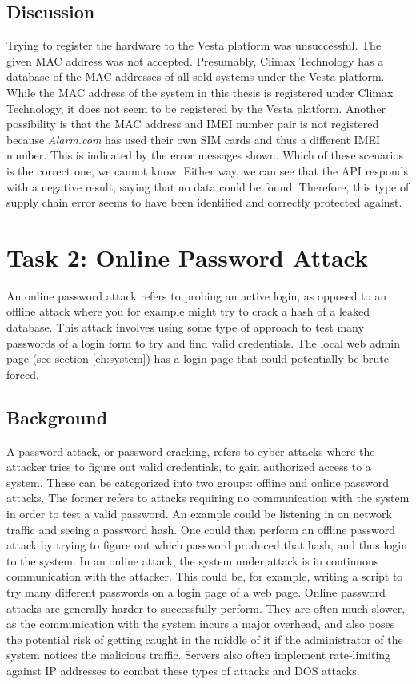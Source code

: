 \subsection{Discussion}
Trying to register the hardware to the Vesta platform was unsuccessful. The given MAC address was not accepted. Presumably, Climax Technology has a database of the MAC addresses of all sold systems under the Vesta platform. While the MAC address of the system in this thesis is registered under Climax Technology, it does not seem to be registered by the Vesta platform. Another possibility is that the MAC address and IMEI number pair is not registered because \textit{Alarm.com} has used their own SIM cards and thus a different IMEI number. This is indicated by the error messages shown. Which of these scenarios is the correct one, we cannot know. Either way, we can see that the API responds with a negative result, saying that no data could be found. Therefore, this type of supply chain error seems to have been identified and correctly protected against.

\section{Task 2: Online Password Attack} \label{ch:pentesting:password}
An online password attack refers to probing an active login, as opposed to an offline attack where you for example might try to crack a hash of a leaked database. This attack involves using some type of approach to test many passwords of a login form to try and find valid credentials. The local web admin page (see section \ref{ch:system}) has a login page that could potentially be brute-forced.

\subsection{Background}
A password attack, or password cracking, refers to cyber-attacks where the attacker tries to figure out valid credentials, to gain authorized access to a system. These can be categorized into two groups: offline and online password attacks. The former refers to attacks requiring no communication with the system in order to test a valid password. An example could be listening in on network traffic and seeing a password hash. One could then perform an offline password attack by trying to figure out which password produced that hash, and thus login to the system. In an online attack, the system under attack is in continuous communication with the attacker. This could be, for example, writing a script to try many different passwords on a login page of a web page. Online password attacks are generally harder to successfully perform. They are often much slower, as the communication with the system incurs a major overhead, and also poses the potential risk of getting caught in the middle of it if the administrator of the system notices the malicious traffic. Servers also often implement rate-limiting against IP addresses to combat these types of attacks and DOS attacks.

